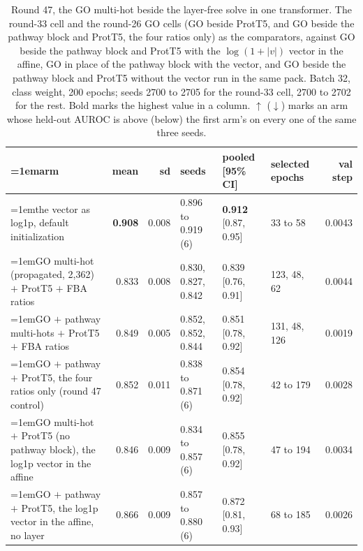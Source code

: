 \begin{table}[H]
  \centering
  \scriptsize
  \setlength{\tabcolsep}{2.5pt}
  \caption[Round 47, the GO multi-hot beside the layer-free solve in one transformer]{Round 47, the GO multi-hot beside the layer-free solve in one transformer. The round-33 cell and the round-26 GO cells (GO beside ProtT5, and GO beside the pathway block and ProtT5, the four ratios only) as the comparators, against GO beside the pathway block and ProtT5 with the $\log(1 + |v|)$ vector in the affine, GO in place of the pathway block with the vector, and GO beside the pathway block and ProtT5 without the vector run in the same pack. Batch 32, class weight, 200 epochs; seeds 2700 to 2705 for the round-33 cell, 2700 to 2702 for the rest. Bold marks the highest value in a column. $\uparrow$ ($\downarrow$) marks an arm whose held-out AUROC is above (below) the first arm's on every one of the same three seeds.}
  \label{tab:w63}
  \begin{tabular}{@{}>{\raggedright\hangindent=1em\hangafter=1\arraybackslash}p{83.4mm}rrlllr@{}}
    \hline
    arm & mean & sd & seeds & pooled [95\% CI] & selected epochs & val step \\
    \hline
    the vector as log1p, default initialization & \textbf{0.908} & 0.008 & 0.896 to 0.919 (6) & \textbf{0.912} [0.87, 0.95] & 33 to 58 & 0.0043 \\
    GO multi-hot (propagated, 2,362) $+$ ProtT5 $+$ FBA ratios & 0.833 & 0.008 & 0.830, 0.827, 0.842 & 0.839 [0.76, 0.91] & 123, 48, 62 & 0.0044 \\
    GO $+$ pathway multi-hots $+$ ProtT5 $+$ FBA ratios & 0.849 & 0.005 & 0.852, 0.852, 0.844 & 0.851 [0.78, 0.92] & 131, 48, 126 & 0.0019 \\
    GO $+$ pathway $+$ ProtT5, the four ratios only (round 47 control) & 0.852 & 0.011 & 0.838 to 0.871 (6) & 0.854 [0.78, 0.92] & 42 to 179 & 0.0028 \\
    GO multi-hot $+$ ProtT5 (no pathway block), the log1p vector in the affine & 0.846 & 0.009 & 0.834 to 0.857 (6) & 0.855 [0.78, 0.92] & 47 to 194 & 0.0034 \\
    GO $+$ pathway $+$ ProtT5, the log1p vector in the affine, no layer & 0.866 & 0.009 & 0.857 to 0.880 (6) & 0.872 [0.81, 0.93] & 68 to 185 & 0.0026 \\
    \hline
  \end{tabular}
\end{table}
